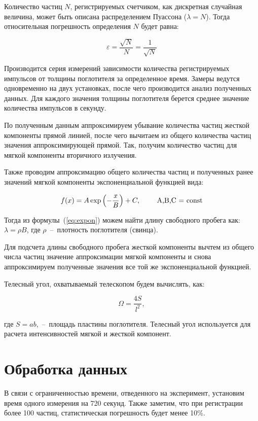 \documentclass[reprint, nofootinbib, nobalancelastpage, 10pt]{revtex4-2}
\begin{document}
Количество частиц $N$, регистрируемых счетчиком, как дискретная случайная величина, может
быть описана распределением Пуассона ($\lambda = N$). Тогда относительная погрешность
определения $N$ будет равна:

\[ \varepsilon = \dfrac{\sqrt{N}}{N} = \dfrac{1}{\sqrt{N}} \]

Производится серия измерений зависимости количества регистрируемых импульсов от толщины
поглотителя за определенное время. Замеры ведутся одновременно на двух установках, после
чего производится анализ полученных данных. Для каждого значения толщины поглотителя
берется среднее значение количества импульсов в секунду.

По полученным данным аппроксимируем убывание количества частиц жесткой компоненты прямой
линией, после чего вычитаем из общего количества частиц значения аппроксимирующей прямой.
Так, получим количество частиц для мягкой компоненты вторичного излучения.

Также проводим аппроксимацию общего количества частиц и полученных ранее значений мягкой
компоненты экспоненциальной функцией вида:

\[ f(x) = A \exp \left(-\frac{x}{B} \right) + C,\text{\hspace*{20pt} A,B,C = const} \]

Тогда из формулы~(\ref{eq:expon}) можем найти длину свободного пробега как:
$\lambda = \rho B$, где $\rho$~--~плотность поглотителя (свинца).

Для подсчета длины свободного пробега жесткой компоненты вычтем из общего числа частиц
значение аппроксимации мягкой компоненты и снова аппроксимируем полученные значения все
той же экспоненциальной функцией.

Телесный угол, охватываемый телескопом будем вычислять, как:

\[ \Omega = \dfrac{4S}{l^2}, \]

где $S = ab$,~--~площадь пластины поглотителя. Телесный угол используется для расчета
интенсивностей мягкой и жесткой компонент.


\section*{Обработка данных}

В связи с ограниченностью времени, отведенного на эксперимент, установим время одного
измерения на 720 секунд. Также заметим, что при регистрации более 100 частиц,
статистическая погрешность будет менее 10\%.
\end{document}
